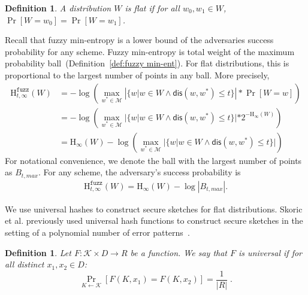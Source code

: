 \documentclass[11pt]{article}
\newcommand{\defref}[1]{\mbox{Definition~\ref{#1}}}
\newcommand{\dis}{\ensuremath{\mathsf{dis}}}
\newcommand{\Hoo}{\mathrm{H}_\infty}
\newcommand{\Hfuzz}{\mathrm{H}^{\mathtt{fuzz}}_{t,\infty}}
\newtheorem{definition}[theorem]{Definition}
\begin{document}
\begin{definition}
A distribution $W$ is \emph{flat} if for all $w_0, w_1 \in W$, $\Pr[W=w_0] = \Pr[W=w_1]$.  
\end{definition}

Recall that fuzzy min-entropy is a lower bound of the adversaries success probability for any scheme.  Fuzzy min-entropy is total weight of the maximum probability ball~(\defref{def:fuzzy min-ent}).  For flat distributions, this is proportional to the largest number of points in any ball.  More precisely, 
\begin{align*}
\Hfuzz(W) &= -\log \left(\max_{w^* \in \mathcal{M}} \left| \{w | w\in W \wedge \dis(w, w^*)\le t\} \right|* \Pr[W=w]\right) \\
&= -\log\left( \max_{w^* \in \mathcal{M}} |\{w | w\in W \wedge \dis(w, w^*)\le t\}| *2^{-\Hoo(W)}\right) \\
&=\Hoo(W) -\log\left( \max_{w^* \in \mathcal{M}}| \{w | w\in W \wedge \dis(w, w^*)\le t\} |\right)
\end{align*}
For notational convenience, we denote the ball with the largest number of points as $B_{t, max}$.  For any scheme, the adversary's success probability is 
\begin{align}
\Hfuzz(W) = \Hoo(W) -\log |B_{t, max}|.\label{eq:fuzz for flat}
\end{align}

\noindent We use universal hashes to construct secure sketches for flat distributions.  Skoric et al. previously used universal hash functions to construct secure sketches in the setting of a polynomial number of error patterns~\cite{skoric2009efficient}.


\begin{definition}
Let $F : \mathcal{K} \times D \to R$ be a function.  We say that $F$ is \emph{universal} if for all distinct $x_1, x_2 \in D$:
\[
 \Pr_{K \leftarrow \mathcal{K}}[F(K, x_1) = F(K, x_2)] = \frac{1}{|R|} \;.
\]
\end{definition}
\end{document}
